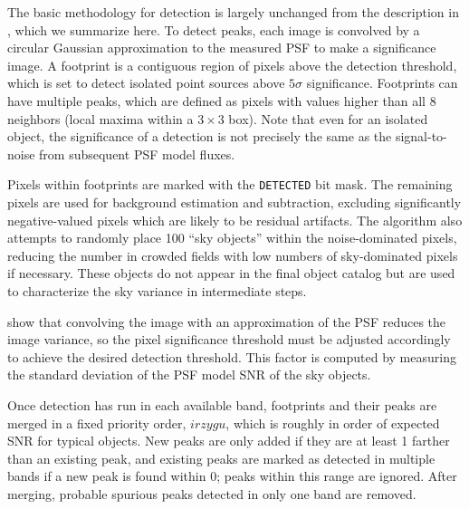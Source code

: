 The basic methodology for detection is largely unchanged from the description in \citet[][]{2018PASJ...70S...5B}, which we summarize here.
To detect peaks, each image is convolved by a circular Gaussian approximation to the measured \gls{PSF} to make a significance image.
A \gls{footprint} is a contiguous region of pixels above the detection threshold, which is set to detect isolated point sources above $5\sigma$ significance.
Footprints can have multiple peaks, which are defined as pixels with values higher than all 8 neighbors (local maxima within a $3 \times 3$ box).
Note that even for an isolated object, the significance of a detection is not precisely the same as the signal-to-noise from subsequent \gls{PSF} model fluxes.

Pixels within footprints are marked with the \texttt{DETECTED} bit mask.
The remaining pixels are used for \gls{background} estimation and subtraction, excluding significantly negative-valued pixels which are likely to be residual artifacts.
The \gls{algorithm} also attempts to randomly place 100 ``sky objects'' within the noise-dominated pixels, reducing the number in crowded fields with low numbers of sky-dominated pixels if necessary.
These objects do not appear in the final object catalog but are used to characterize the sky variance in intermediate steps.

\citet[][]{2019PASJ...71..114A} show that convolving the image with an approximation of the \gls{PSF} reduces the image variance, so the pixel significance threshold must be adjusted accordingly to achieve the desired detection threshold.
This factor is computed by measuring the standard deviation of the \gls{PSF} model \gls{SNR} of the sky objects.

Once detection has run in each available band, \gls{footprint}s and their peaks are merged in a fixed priority order, $irzygu$, which is roughly in order of expected \gls{SNR} for typical objects.
New peaks are only added if they are at least 1 farther than an existing peak, and existing peaks are marked as detected in multiple bands if a new peak is found within 0; peaks within this range are ignored.
After merging, probable spurious peaks detected in only one band are removed.

